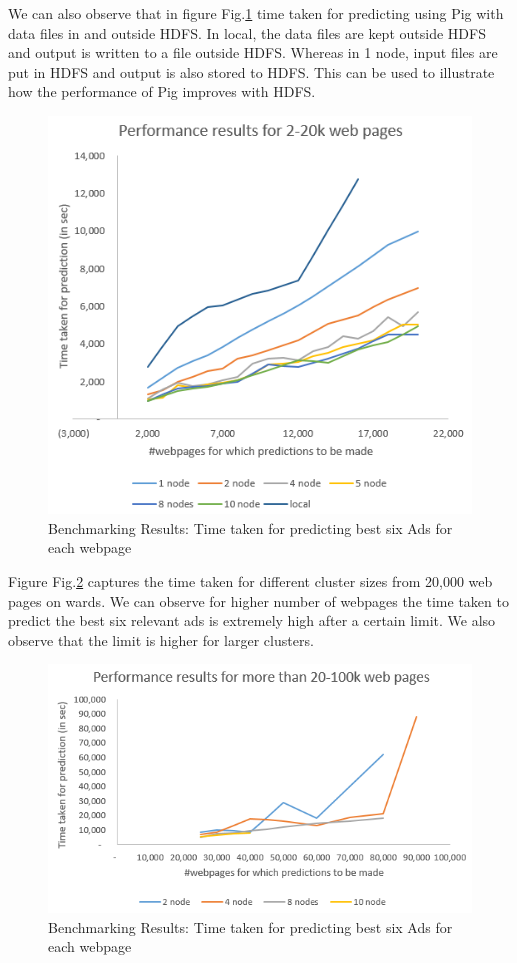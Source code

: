 \documentclass[9pt,twocolumn,twoside]{../../styles/osajnl}
\begin{document}
We can also observe that in figure Fig.\ref{fig:xlarge_20k} time taken for predicting using Pig with data files in and outside HDFS. In local, the data files are kept outside HDFS and output is written to a file outside HDFS. Whereas in 1 node, input files are put in HDFS and output is also stored to HDFS. This can be used to illustrate how the performance of Pig improves with HDFS.

\begin{figure}[hptb]
\centering
\includegraphics[width=\linewidth]{images/xlarge_20k.PNG}
\caption{ Benchmarking Results: Time taken for predicting best six Ads for each webpage}
\label{fig:xlarge_20k}
\end{figure}

Figure Fig.\ref{fig:xlarge_100k} captures the time taken for different cluster sizes from 20,000 web pages on wards. We can observe for higher number of webpages the time taken to predict the best six relevant ads is extremely high after a certain limit. We also observe that the limit is higher for larger clusters.

\begin{figure}[hptb]
\centering
\includegraphics[width=\linewidth]{images/xlarge_100k.PNG}
\caption{ Benchmarking Results: Time taken for predicting best six Ads for each webpage}
\label{fig:xlarge_100k}
\end{figure}
\end{document}
